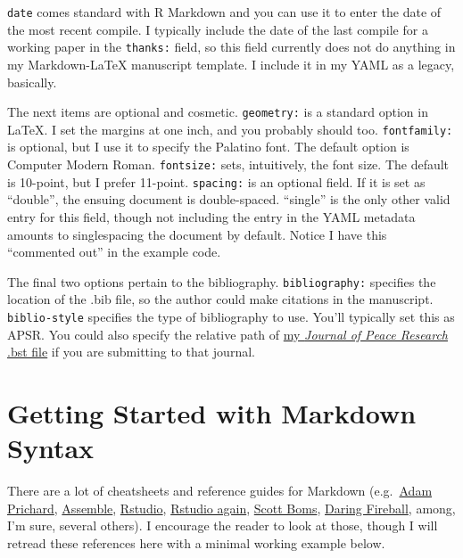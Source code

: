 \documentclass[10pt,a4paper]{article}
\begin{document}
\texttt{date} comes standard with R Markdown and you can use it to enter
the date of the most recent compile. I typically include the date of the
last compile for a working paper in the \texttt{thanks:} field, so this
field currently does not do anything in my Markdown-LaTeX manuscript
template. I include it in my YAML as a legacy, basically.

The next items are optional and cosmetic. \texttt{geometry:} is a
standard option in LaTeX. I set the margins at one inch, and you
probably should too. \texttt{fontfamily:} is optional, but I use it to
specify the Palatino font. The default option is Computer Modern Roman.
\texttt{fontsize:} sets, intuitively, the font size. The default is
10-point, but I prefer 11-point. \texttt{spacing:} is an optional field.
If it is set as ``double'', the ensuing document is double-spaced.
``single'' is the only other valid entry for this field, though not
including the entry in the YAML metadata amounts to singlespacing the
document by default. Notice I have this ``commented out'' in the example
code.

The final two options pertain to the bibliography.
\texttt{bibliography:} specifies the location of the .bib file, so the
author could make citations in the manuscript. \texttt{biblio-style}
specifies the type of bibliography to use. You'll typically set this as
APSR. You could also specify the relative path of
\href{http://svmiller.com/miscellany/journal-of-peace-research-bst-file/}{my
\emph{Journal of Peace Research} .bst file} if you are submitting to
that journal.

\hypertarget{getting-started-with-markdown-syntax}{%
\section{Getting Started with Markdown
Syntax}\label{getting-started-with-markdown-syntax}}

There are a lot of cheatsheets and reference guides for Markdown
(e.g.~\href{https://github.com/adam-p/markdown-here/wiki/Markdown-Cheatsheet}{Adam
Prichard},
\href{http://assemble.io/docs/Cheatsheet-Markdown.html}{Assemble},
\href{https://www.rstudio.com/wp-content/uploads/2015/02/rmarkdown-cheatsheet.pdf}{Rstudio},
\href{https://www.rstudio.com/wp-content/uploads/2015/03/rmarkdown-reference.pdf}{Rstudio
again},
\href{http://scottboms.com/downloads/documentation/markdown_cheatsheet.pdf}{Scott
Boms}, \href{https://daringfireball.net/projects/markdown/syntax}{Daring
Fireball}, among, I'm sure, several others). I encourage the reader to
look at those, though I will retread these references here with a
minimal working example below.
\end{document}
